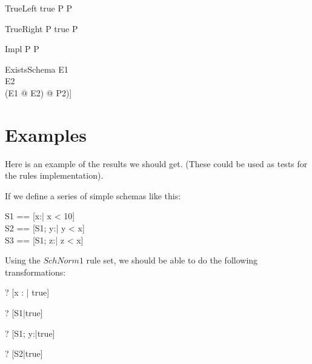 \documentclass{article}
\begin{document}
\begin{zedrule}{TrueLeft}
  true \land P \iff P
\end{zedrule}

\begin{zedrule}{TrueRight}
  P \land true \iff P
\end{zedrule}

\begin{zedrule}{Impl}
  P \iff P
\end{zedrule}

\begin{zedrule}{ExistsSchema}
   E1 \unfoldsTo [D1 | P1] \\
   E2 \unfoldsTo [D2 | P2] \\
   [D2|true] \schemaminus [D1|true] \is [D3|true]
\derives
   (\exists E1 @ E2) \unfoldsTo [D3 | (\exists [D1|P1] @ P2)]
\end{zedrule}


\section*{Examples}
Here is an example of the results we should get.
(These could be used as tests for the rules implementation).

If we define a series of simple schemas like this:

\begin{zed}
  S1 == [x:\nat | x < 10] \\
  S2 == [S1; y:\nat | y < x] \\
  S3 == [S1; z:\nat | z < x]
\end{zed}

Using the $SchNorm1$ rule set, we should be able to
do the following transformations:

\begin{zed}
  \vdash? [x : \nat | true] 
\end{zed}
\begin{zed}
  \vdash? [S1|true] 
\end{zed}
\begin{zed}
  \vdash? [S1; y:\nat|true] 
\end{zed}
\begin{zed}
  \vdash? [S2|true] 
\end{zed}
\end{document}
